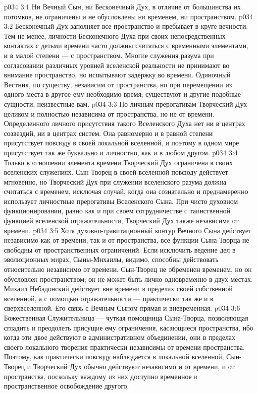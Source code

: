\vs p034 3:1 Ни Вечный Сын, ни Бесконечный Дух, в отличие от большинства их потомков, не ограничены и не обусловлены ни временем, ни пространством.
\vs p034 3:2 Бесконечный Дух заполняет все пространство и пребывает в круге вечности. Тем не менее, личности Бесконечного Духа при своих непосредственных контактах с детьми времени часто должны считаться с временными элементами, и в малой степени --- с пространством. Многие служения разума при согласовании различных уровней вселенской реальности не принимают во внимание пространство, но испытывают задержку во времени. Одиночный Вестник, по существу, независим от пространства, но при перемещении из одного места в другое ему необходимо время; существуют и другие подобные сущности, неизвестные вам.
\vs p034 3:3 \pc По личным прерогативам Творческий Дух целиком и полностью независима от пространства, но не от времени. Определенного личного присутствия такого Вселенского Духа нет ни в центрах созвездий, ни в центрах систем. Она равномерно и в равной степени присутствует повсюду в своей локальной вселенной, и поэтому в одном мире присутствует так же буквально и личностно, как и в любом другом.
\vs p034 3:4 Только в отношении элемента времени Творческий Дух ограничена в своих вселенских служениях. Сын\hyp{}Творец в своей вселенной повсюду действует мгновенно, но Творческий Дух при служении вселенского разума должна считаться с временем, исключая случай, когда она сознательно и преднамеренно использует личностные прерогативы Вселенского Сына. При чисто духовном функционировании, равно как и при своем сотрудничестве с таинственной функцией вселенской отражательности, Творческий Дух также независима от времени.
\vs p034 3:5 \pc Хотя духовно\hyp{}гравитационный контур Вечного Сына действует независимо как от времени, так и от пространства, все функции Сына\hyp{}Творца не свободны от пространственных ограничений. Если исключить ведение дел в эволюционных мирах, Сыны\hyp{}Михаилы, видимо, способны действовать относительно независимо от времени. Сын\hyp{}Творец не обременен временем, но он обусловлен пространством; он не может быть лично одновременно в двух местах. Михаил Небадонский действует вне времени в пределах своей собственной вселенной, а с помощью отражательности --- практически так же и в сверхвселенной. Его связь с Вечным Сыном прямая и вневременная.
\vs p034 3:6 Божественная Служительница --- чуткая помощница Сына\hyp{}Творца, позволяющая сгладить и преодолеть присущие ему ограничения, касающиеся пространства, ибо когда эти двое действуют в административном объединении, они в пределах своего локального творения практически независимы от времени  пространства. Поэтому, как практически повсюду наблюдается в локальной вселенной, Сын\hyp{}Творец и Творческий Дух обычно действуют независимо и от времени, и от пространства, поскольку каждому из них доступно временное и пространственное освобождение другого.
